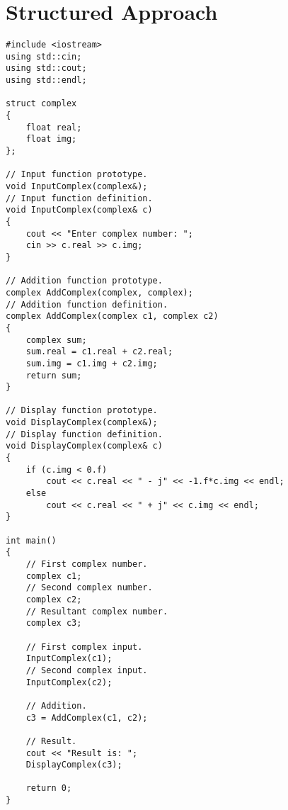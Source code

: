 \documentclass[12pt,a4paper]{article}
\begin{document}
\section{Structured Approach}
\begin{lstlisting}[caption={Using \texttt{struct} to define complex number and add them using functions}]
#include <iostream>
using std::cin;
using std::cout;
using std::endl;

struct complex
{
	float real;
	float img;
};

// Input function prototype.
void InputComplex(complex&);
// Input function definition.
void InputComplex(complex& c)
{
	cout << "Enter complex number: ";
	cin >> c.real >> c.img;
}

// Addition function prototype.
complex AddComplex(complex, complex);
// Addition function definition.
complex AddComplex(complex c1, complex c2)
{
	complex sum;
	sum.real = c1.real + c2.real;
	sum.img = c1.img + c2.img;
	return sum;
}

// Display function prototype.
void DisplayComplex(complex&);
// Display function definition.
void DisplayComplex(complex& c)
{
	if (c.img < 0.f)
		cout << c.real << " - j" << -1.f*c.img << endl;
	else
		cout << c.real << " + j" << c.img << endl;
}

int main()
{
	// First complex number.
	complex c1;
	// Second complex number.
	complex c2;
	// Resultant complex number.
	complex c3;
	
	// First complex input.
	InputComplex(c1);
	// Second complex input.
	InputComplex(c2);
	
	// Addition.
	c3 = AddComplex(c1, c2);
	
	// Result.
	cout << "Result is: ";
	DisplayComplex(c3);
	
	return 0;
}
\end{lstlisting}
\end{document}
